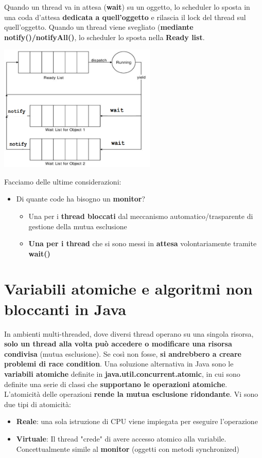 \documentclass[12pt]{article}
\begin{document}
Quando un thread va in attesa (\textbf{wait}) su un oggetto, lo scheduler lo sposta in una coda d'attesa \textbf{dedicata a quell'oggetto} e rilascia il lock del thread sul quell'oggetto. Quando un thread viene svegliato (\textbf{mediante notify()/notifyAll()}, lo scheduler lo sposta nella \textbf{Ready list}.
\begin{center}
    \includegraphics[width = 7.50cm]{Images/86.PNG}
\end{center}
Facciamo delle ultime considerazioni:
\begin{itemize}
    \item Di quante code ha bisogno un \textbf{monitor}?
          \begin{itemize}
              \item Una per i \textbf{thread bloccati} dal meccanismo automatico/trasparente di gestione della mutua esclusione
              \item \textbf{Una per i thread} che si sono messi in \textbf{attesa} volontariamente tramite \textbf{wait()}
          \end{itemize}
\end{itemize}
\section{Variabili atomiche e algoritmi non bloccanti in Java}
In ambienti multi-threaded, dove diversi thread operano su una singola risorsa, \textbf{solo un thread alla volta può accedere o modificare una risorsa condivisa} (mutua esclusione). Se così non fosse, \textbf{si andrebbero a creare problemi di race condition}. Una soluzione alternativa in Java sono le \textbf{variabili atomiche} definite in \textbf{java.util.concurrent.atomic}, in cui sono definite una serie di classi che \textbf{supportano le operazioni atomiche}. L'atomicità delle operazioni \textbf{rende la mutua esclusione ridondante}. Vi sono due tipi di atomicità:
\begin{itemize}
    \item \textbf{Reale}: una sola istruzione di CPU viene impiegata per eseguire l'operazione
    \item \textbf{Virtuale}: Il thread "crede" di avere accesso atomico alla variabile. Concettualmente simile al \textbf{monitor} (oggetti con metodi synchronized)
\end{itemize}
\end{document}
